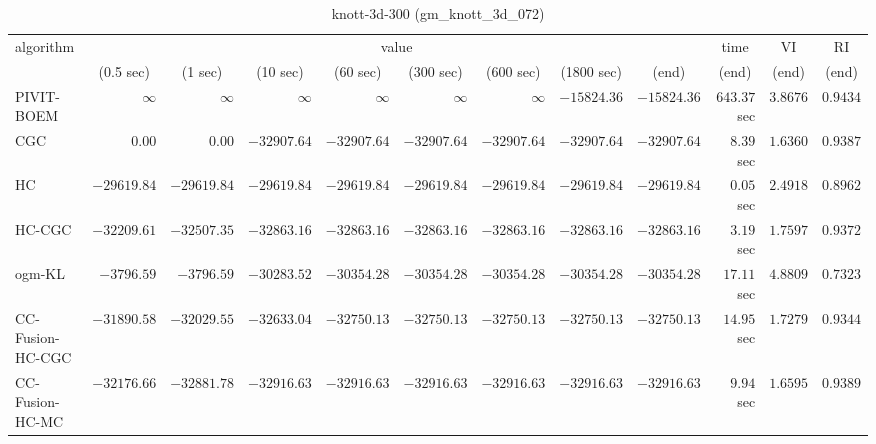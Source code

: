 \begin{table}[H]
\scriptsize
\centering
\caption{knott-3d-300 (gm\_knott\_3d\_072)}
\label{tab:anytimetable-knott-3d-300-gm-knott-3d-072}
\begin{tabular}{lrrrrrrrrrrr}
\toprule
           algorithm &                                   \multicolumn{8}{c}{value} & \multicolumn{1}{c}{time}    & \multicolumn{1}{c}{VI}  & \multicolumn{1}{c}{RI} \\  
\cmidrule(lr){2-9}\cmidrule(lr){10-10} \cmidrule(lr){11-11} \cmidrule(lr){12-12}   
                     & \multicolumn{1}{c}{(0.5 sec)} & \multicolumn{1}{c}{(1 sec)} & \multicolumn{1}{c}{(10 sec)} & \multicolumn{1}{c}{(60 sec)} & \multicolumn{1}{c}{(300 sec)} & \multicolumn{1}{c}{(600 sec)} & \multicolumn{1}{c}{(1800 sec)} & \multicolumn{1}{c}{(end)} & \multicolumn{1}{c}{(end)}    & \multicolumn{1}{c}{(end)}   & \multicolumn{1}{c}{(end)}  \\ \midrule 
          PIVIT-BOEM & $\infty$ & $\infty$ & $\infty$ & $\infty$ & $\infty$ & $\infty$ & $    -15824.36$ & $    -15824.36$ & $       643.37$ sec    & $       3.8676$  & $       0.9434$ \\ 
                 CGC & $         0.00$ & $         0.00$ & $    -32907.64$ & $    -32907.64$ & $    -32907.64$ & $    -32907.64$ & $    -32907.64$ & $    -32907.64$ & $         8.39$ sec    & $       1.6360$  & $       0.9387$ \\ 
                  HC & $    -29619.84$ & $    -29619.84$ & $    -29619.84$ & $    -29619.84$ & $    -29619.84$ & $    -29619.84$ & $    -29619.84$ & $    -29619.84$ & $         0.05$ sec    & $       2.4918$  & $       0.8962$ \\ 
              HC-CGC & $    -32209.61$ & $    -32507.35$ & $    -32863.16$ & $    -32863.16$ & $    -32863.16$ & $    -32863.16$ & $    -32863.16$ & $    -32863.16$ & $         3.19$ sec    & $       1.7597$  & $       0.9372$ \\ 
              ogm-KL & $     -3796.59$ & $     -3796.59$ & $    -30283.52$ & $    -30354.28$ & $    -30354.28$ & $    -30354.28$ & $    -30354.28$ & $    -30354.28$ & $        17.11$ sec    & $       4.8809$  & $       0.7323$ \\ 
    CC-Fusion-HC-CGC & $    -31890.58$ & $    -32029.55$ & $    -32633.04$ & $    -32750.13$ & $    -32750.13$ & $    -32750.13$ & $    -32750.13$ & $    -32750.13$ & $        14.95$ sec    & $       1.7279$  & $       0.9344$ \\ 
     CC-Fusion-HC-MC & $    -32176.66$ & $    -32881.78$ & $    -32916.63$ & $    -32916.63$ & $    -32916.63$ & $    -32916.63$ & $    -32916.63$ & $    -32916.63$ & $         9.94$ sec    & $       1.6595$  & $       0.9389$ \\ 

\end{tabular}
\end{table}
